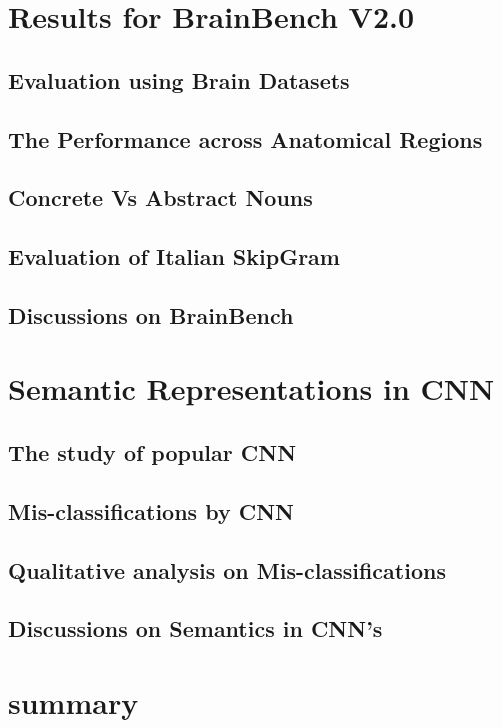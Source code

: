 \label{chapter:eval}

\section{Results for BrainBench V2.0}

\subsection{Evaluation using Brain Datasets}
\subsection{The Performance across Anatomical Regions}

\subsection{Concrete Vs Abstract Nouns}

\subsection{Evaluation of Italian SkipGram}

\subsection{Discussions on BrainBench}

\section{Semantic Representations in CNN}

\subsection{The study of popular CNN}
\subsection{Mis-classifications by CNN}
\subsection{Qualitative analysis on Mis-classifications}
\subsection{Discussions on Semantics in CNN's}
\section{summary}



